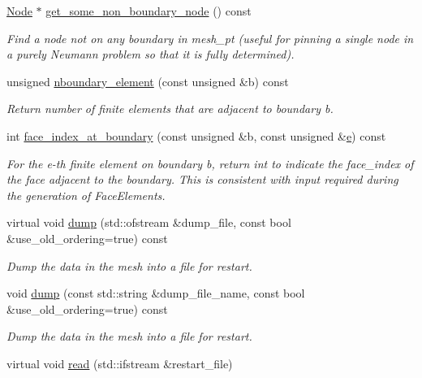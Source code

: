 \begin{DoxyCompactItemize}
\hyperlink{classoomph_1_1Node}{Node} $\ast$ \hyperlink{classoomph_1_1Mesh_ada7a88cfce20feae01e6841bf4375228}{get\+\_\+some\+\_\+non\+\_\+boundary\+\_\+node} () const
\begin{DoxyCompactList}\small\item\em Find a node not on any boundary in mesh\+\_\+pt (useful for pinning a single node in a purely Neumann problem so that it is fully determined). \end{DoxyCompactList}\item 
unsigned \hyperlink{classoomph_1_1Mesh_a68e04b3b70cff70d53d75f66661555e8}{nboundary\+\_\+element} (const unsigned \&b) const
\begin{DoxyCompactList}\small\item\em Return number of finite elements that are adjacent to boundary b. \end{DoxyCompactList}\item 
int \hyperlink{classoomph_1_1Mesh_a6095e417593de6136d248ab08823f453}{face\+\_\+index\+\_\+at\+\_\+boundary} (const unsigned \&b, const unsigned \&\hyperlink{cfortran_8h_a37cd013acc76697829c324bdd8562d82}{e}) const
\begin{DoxyCompactList}\small\item\em For the e-\/th finite element on boundary b, return int to indicate the face\+\_\+index of the face adjacent to the boundary. This is consistent with input required during the generation of Face\+Elements. \end{DoxyCompactList}\item 
virtual void \hyperlink{classoomph_1_1Mesh_af821b936768868ea5dd91495e9ae3bc0}{dump} (std\+::ofstream \&dump\+\_\+file, const bool \&use\+\_\+old\+\_\+ordering=true) const
\begin{DoxyCompactList}\small\item\em Dump the data in the mesh into a file for restart. \end{DoxyCompactList}\item 
void \hyperlink{classoomph_1_1Mesh_afa8d0d8b55c1bb10982fe5449fd6389e}{dump} (const std\+::string \&dump\+\_\+file\+\_\+name, const bool \&use\+\_\+old\+\_\+ordering=true) const
\begin{DoxyCompactList}\small\item\em Dump the data in the mesh into a file for restart. \end{DoxyCompactList}\item 
virtual void \hyperlink{classoomph_1_1Mesh_ac192b41d1a24297ff38854548defd92b}{read} (std\+::ifstream \&restart\+\_\+file)

\end{DoxyCompactItemize}
